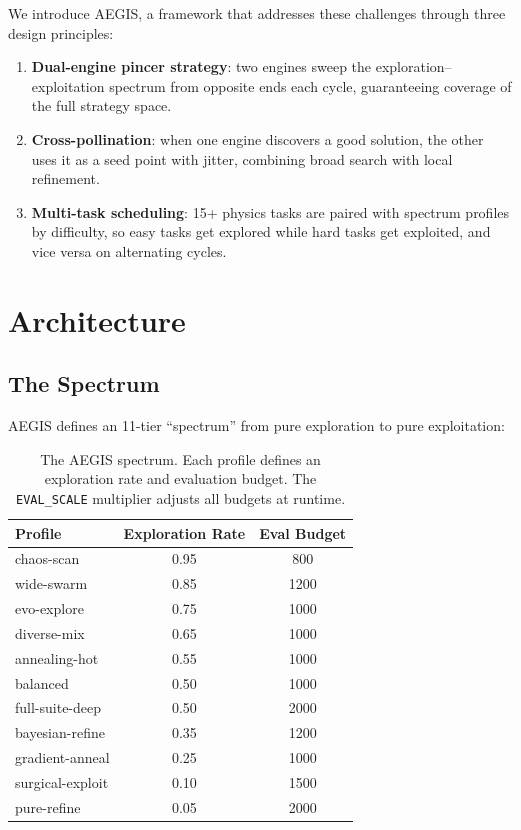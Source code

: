 \documentclass[12pt,preprint]{aastex631}
\begin{document}
We introduce AEGIS, a framework that addresses these challenges through
three design principles:
\begin{enumerate}
  \item \textbf{Dual-engine pincer strategy}: two engines sweep
    the exploration--exploitation spectrum from opposite ends each cycle,
    guaranteeing coverage of the full strategy space.
  \item \textbf{Cross-pollination}: when one engine discovers a good
    solution, the other uses it as a seed point with jitter,
    combining broad search with local refinement.
  \item \textbf{Multi-task scheduling}: 15+ physics tasks are paired
    with spectrum profiles by difficulty, so easy tasks get explored
    while hard tasks get exploited, and vice versa on alternating cycles.
\end{enumerate}

\section{Architecture}
\label{sec:arch}

\subsection{The Spectrum}

AEGIS defines an 11-tier ``spectrum'' from pure exploration to pure exploitation:

\begin{table}[h]
\centering
\begin{tabular}{lcc}
\hline
Profile & Exploration Rate & Eval Budget \\
\hline
chaos-scan       & 0.95 & 800  \\
wide-swarm       & 0.85 & 1200 \\
evo-explore      & 0.75 & 1000 \\
diverse-mix      & 0.65 & 1000 \\
annealing-hot    & 0.55 & 1000 \\
balanced         & 0.50 & 1000 \\
full-suite-deep  & 0.50 & 2000 \\
bayesian-refine  & 0.35 & 1200 \\
gradient-anneal  & 0.25 & 1000 \\
surgical-exploit & 0.10 & 1500 \\
pure-refine      & 0.05 & 2000 \\
\hline
\end{tabular}
\caption{The AEGIS spectrum. Each profile defines an exploration rate
and evaluation budget. The \texttt{EVAL\_SCALE} multiplier adjusts
all budgets at runtime.}
\label{tab:spectrum}
\end{table}
\end{document}

